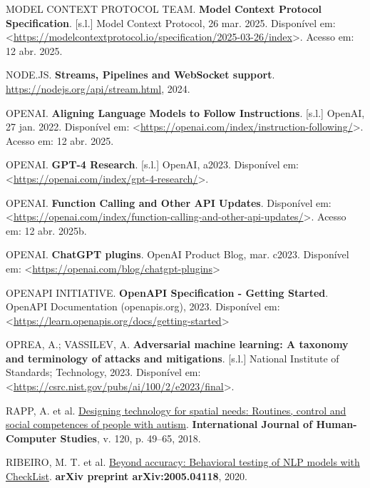 \documentclass[
]{article}
\newlength{\cslhangindent}
\newenvironment{CSLReferences}[2] %
 {\begin{list}{}{%
  \setlength{\itemindent}{0pt}
  \setlength{\leftmargin}{0pt}
  \setlength{\parsep}{0pt}
  \ifodd #1
   \setlength{\leftmargin}{\cslhangindent}
   \setlength{\itemindent}{-1\cslhangindent}
  \fi
  \setlength{\itemsep}{#2\baselineskip}}}
 {\end{list}}
\begin{document}
\begin{CSLReferences}{0}{1}
MODEL CONTEXT PROTOCOL TEAM. \textbf{Model Context Protocol
Specification}. {[}s.l.{]} Model Context Protocol, 26 mar. 2025.
Disponível em:
\textless{}\url{https://modelcontextprotocol.io/specification/2025-03-26/index}\textgreater.
Acesso em: 12 abr. 2025.

NODE.JS. \textbf{Streams, Pipelines and WebSocket support}.
\url{https://nodejs.org/api/stream.html}, 2024.

OPENAI. \textbf{Aligning Language Models to Follow Instructions}.
{[}s.l.{]} OpenAI, 27 jan. 2022. Disponível em:
\textless{}\url{https://openai.com/index/instruction-following/}\textgreater.
Acesso em: 12 abr. 2025.

OPENAI. \textbf{GPT-4 Research}. {[}s.l.{]} OpenAI, a2023. Disponível
em:
\textless{}\url{https://openai.com/index/gpt-4-research/}\textgreater.

OPENAI. \textbf{Function Calling and Other API Updates}. Disponível em:
\textless{}\url{https://openai.com/index/function-calling-and-other-api-updates/}\textgreater.
Acesso em: 12 abr. 2025b.

OPENAI. \textbf{{ChatGPT plugins}}. OpenAI Product Blog, mar. c2023.
Disponível em:
\textless{}\url{https://openai.com/blog/chatgpt-plugins}\textgreater{}

OPENAPI INITIATIVE. \textbf{{OpenAPI Specification - Getting Started}}.
OpenAPI Documentation (openapis.org), 2023. Disponível em:
\textless{}\url{https://learn.openapis.org/docs/getting-started}\textgreater{}

OPREA, A.; VASSILEV, A. \textbf{Adversarial machine learning: A taxonomy
and terminology of attacks and mitigations}. {[}s.l.{]} National
Institute of Standards; Technology, 2023. Disponível em:
\textless{}\url{https://csrc.nist.gov/pubs/ai/100/2/e2023/final}\textgreater.

RAPP, A. et al.
\href{https://doi.org/10.1016/j.ijhcs.2018.07.005}{Designing technology
for spatial needs: Routines, control and social competences of people
with autism}. \textbf{International Journal of Human-Computer Studies},
v. 120, p. 49--65, 2018.

RIBEIRO, M. T. et al. \href{https://arxiv.org/abs/2005.04118}{Beyond
accuracy: Behavioral testing of NLP models with CheckList}.
\textbf{arXiv preprint arXiv:2005.04118}, 2020.


\end{CSLReferences}
\end{document}
